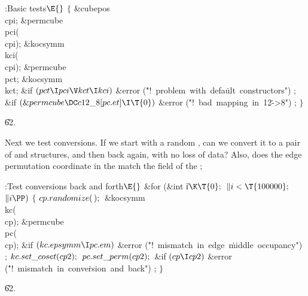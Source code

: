 \Y\B\4:Basic tests\X${}\E{}$\6
${}\{{}$\1\6
\&{cubepos} \\{cpi};\6
\&{permcube} \\{pci}(\\{cpi});\6
\&{kocsymm} \\{kci}(\\{cpi});\6
\&{permcube} \\{pct};\6
\&{kocsymm} \\{kct};\7
\&{if} ${}(\\{pct}\I\\{pci}\V\\{kct}\I\\{kci}){}$\1\6
\&{error} (\.{"!\ problem\ with\ defa}\)\.{ult\ constructors"})\1\5
;\2\2\6
\&{if} ${}(\&{permcube}\DC\\{c12\_8}[\\{pc}.\\{et}]\I\T{0}){}$\1\6
\&{error} (\.{"!\ bad\ mapping\ in\ 12}\)\.{->8"})\1\5
;\2\2\6
\4${}\}{}$\2\par
\U62.\fi

Next we test conversions.  If we start with a random ,
can we convert it to a pair of  and 
structures,
and then back again, with no loss of data?  Also, does the edge
permutation coordinate in the  match the  field of
the  ;

\Y\B\4:Test conversions back and forth\X${}\E{}$\6
\&{for} (\&{int} \|i${}\K\T{0};{}$ ${}\|i<\T{100000};{}$ ${}\|i\PP){}$\5
${}\{{}$\1\6
${}\\{cp}.\\{randomize}(\,);{}$\7
\&{kocsymm} \\{kc}(\\{cp});\6
\&{permcube} \\{pc}(\\{cp});\7
\&{if} ${}(\\{kc}.\\{epsymm}\I\\{pc}.\\{em}){}$\1\6
\&{error} (\.{"!\ mismatch\ in\ edge\ }\)\.{middle\ occupancy"})\1\5
;\2\2\6
${}\\{kc}.\\{set\_coset}(\\{cp2});{}$\6
${}\\{pc}.\\{set\_perm}(\\{cp2});{}$\6
\&{if} ${}(\\{cp}\I\\{cp2}){}$\1\6
\&{error} (\.{"!\ mismatch\ in\ conve}\)\.{rsion\ and\ back"})\1\5
;\2\2\6
\4${}\}{}$\2\par
\U62.\fi

